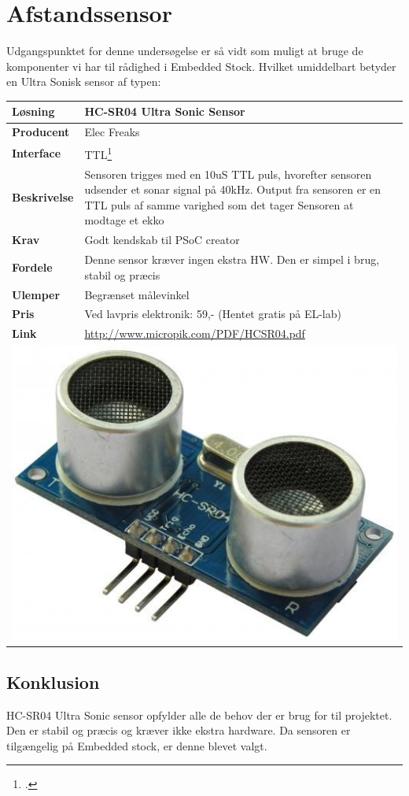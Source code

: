 \section{Afstandssensor}

Udgangspunktet for denne undersøgelse er så vidt som muligt at bruge de komponenter vi har til rådighed i Embedded Stock. Hvilket umiddelbart betyder en Ultra Sonisk sensor af typen:

\begin{table}[H] \centering
\begin{tabular}{|p{3cm}|p{11cm}|}
	\hline
	\textbf{Løsning}		
	    & HC-SR04 Ultra Sonic Sensor
	\\ \hline
	\textbf{Producent} 		
	    & Elec Freaks
	\\ \hline
	\textbf{Interface} 		
	    & TTL\footcite{ttl}
	\\ \hline
	\textbf{Beskrivelse} 	
	    & Sensoren trigges med en 10uS TTL puls, hvorefter sensoren udsender et sonar signal på 40kHz. Output fra sensoren er en TTL puls af samme varighed som det tager Sensoren at modtage et ekko
	\\ \hline
	\textbf{Krav} 			
	    & Godt kendskab til PSoC creator
	\\ \hline
	\textbf{Fordele}		
	    & Denne sensor kræver ingen ekstra HW. Den er simpel i brug, stabil og præcis
	\\ \hline
	\textbf{Ulemper} 		
	    & Begrænset målevinkel
	\\ \hline
	\textbf{Pris} 			
	    & Ved lavpris elektronik: 59,- (Hentet gratis på EL-lab)
	\\ \hline
	\textbf{Link} 			
	    & \url{http://www.micropik.com/PDF/HCSR04.pdf}
	\\ \hline
	\multicolumn{2}{|c|}{\includegraphics[width=0.3\linewidth]{0_Filer/Figuer/Forudundersoegelse/Afstandssensor_billede.jpg}}
    \\ \hline
\end{tabular}
\end{table}

\subsection{Konklusion}

HC-SR04 Ultra Sonic sensor opfylder alle de behov der er brug for til projektet. Den er stabil og præcis og kræver ikke ekstra hardware. Da sensoren er tilgængelig på Embedded stock, er denne blevet valgt.
